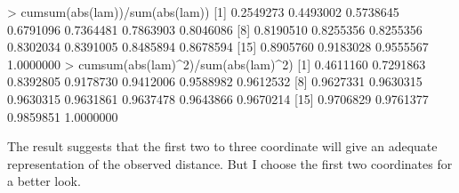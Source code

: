 \documentclass[
]{article}
\newenvironment{Shaded}{\begin{snugshade}}{\end{snugshade}}
\newcommand{\DecValTok}[1]{\textcolor[rgb]{0.00,0.00,0.81}{#1}}
\newcommand{\FloatTok}[1]{\textcolor[rgb]{0.00,0.00,0.81}{#1}}
\newcommand{\FunctionTok}[1]{\textcolor[rgb]{0.00,0.00,0.00}{#1}}
\newcommand{\NormalTok}[1]{#1}
\newcommand{\SpecialCharTok}[1]{\textcolor[rgb]{0.00,0.00,0.00}{#1}}
\begin{document}
\begin{Shaded}
\begin{Highlighting}[]
\SpecialCharTok{\textgreater{}} \FunctionTok{cumsum}\NormalTok{(}\FunctionTok{abs}\NormalTok{(lam))}\SpecialCharTok{/}\FunctionTok{sum}\NormalTok{(}\FunctionTok{abs}\NormalTok{(lam))}
\NormalTok{ [}\DecValTok{1}\NormalTok{] }\FloatTok{0.2549273} \FloatTok{0.4493002} \FloatTok{0.5738645} \FloatTok{0.6791096} \FloatTok{0.7364481} \FloatTok{0.7863903} \FloatTok{0.8046086}
\NormalTok{ [}\DecValTok{8}\NormalTok{] }\FloatTok{0.8190510} \FloatTok{0.8255356} \FloatTok{0.8255356} \FloatTok{0.8302034} \FloatTok{0.8391005} \FloatTok{0.8485894} \FloatTok{0.8678594}
\NormalTok{[}\DecValTok{15}\NormalTok{] }\FloatTok{0.8905760} \FloatTok{0.9183028} \FloatTok{0.9555567} \FloatTok{1.0000000}
\SpecialCharTok{\textgreater{}} \FunctionTok{cumsum}\NormalTok{(}\FunctionTok{abs}\NormalTok{(lam)}\SpecialCharTok{\^{}}\DecValTok{2}\NormalTok{)}\SpecialCharTok{/}\FunctionTok{sum}\NormalTok{(}\FunctionTok{abs}\NormalTok{(lam)}\SpecialCharTok{\^{}}\DecValTok{2}\NormalTok{)}
\NormalTok{ [}\DecValTok{1}\NormalTok{] }\FloatTok{0.4611160} \FloatTok{0.7291863} \FloatTok{0.8392805} \FloatTok{0.9178730} \FloatTok{0.9412006} \FloatTok{0.9588982} \FloatTok{0.9612532}
\NormalTok{ [}\DecValTok{8}\NormalTok{] }\FloatTok{0.9627331} \FloatTok{0.9630315} \FloatTok{0.9630315} \FloatTok{0.9631861} \FloatTok{0.9637478} \FloatTok{0.9643866} \FloatTok{0.9670214}
\NormalTok{[}\DecValTok{15}\NormalTok{] }\FloatTok{0.9706829} \FloatTok{0.9761377} \FloatTok{0.9859851} \FloatTok{1.0000000}
\end{Highlighting}
\end{Shaded}

The result suggests that the first two to three coordinate will give an
adequate representation of the observed distance. But I choose the first
two coordinates for a better look.
\end{document}

